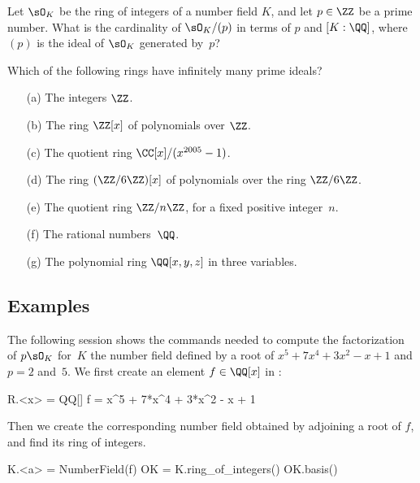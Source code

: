 \begin{exercise}
  Let $\sO_K$ be the ring of integers of a number field $K$, and let $p\in\ZZ$
  be a prime number. What is the cardinality of $\sO_K/(p)$ in terms of $p$
  and $[K:\QQ]$, where $(p)$ is the ideal of $\sO_K$ generated by~$p$?
\end{exercise}

\begin{exercise}
  Which of the following rings have infinitely many prime ideals?
  \begin{enumerate}
    \item[(a)]
    The integers $\ZZ$.
    \item[(b)]
    The ring $\ZZ[x]$ of polynomials over $\ZZ$.
    \item[(c)]
    The quotient ring $\CC[x]/(x^{2005}-1)$.
    \item[(d)]
    The ring $(\ZZ/6\ZZ)[x]$ of polynomials over the ring $\ZZ/6\ZZ$.
    \item[(e)]
    The quotient ring $\ZZ/n\ZZ$, for a fixed positive integer~$n$.
    \item[(f)]
    The rational numbers~$\QQ$.
    \item[(g)]
    The polynomial ring $\QQ[x,y,z]$ in three variables.
  \end{enumerate}
\end{exercise}

\subsection{Examples}

The following {\Sage} session shows the commands needed to compute
the factorization of $p\sO_K$ for~$K$ the number field defined by
a root of $x^5 + 7x^4 + 3x^2 - x + 1$ and $p = 2$ and~$5$. We first
create an element $f\in \QQ[x]$ in {\Sage}:
\begin{sagecode}
\begin{sagecell}
R.<x> = QQ[]
f = x^5 + 7*x^4 + 3*x^2 - x + 1
\end{sagecell}
\end{sagecode} %

\noindent
Then we create the corresponding number field obtained
by adjoining a root of $f$, and find its ring of integers.
\begin{sagecode}
\begin{sagecell}
K.<a> = NumberField(f)
OK = K.ring_of_integers()
OK.basis()
\end{sagecell}
\begin{sageout}
[1, a, a^2, a^3, a^4]
\end{sageout}
\end{sagecode} %

